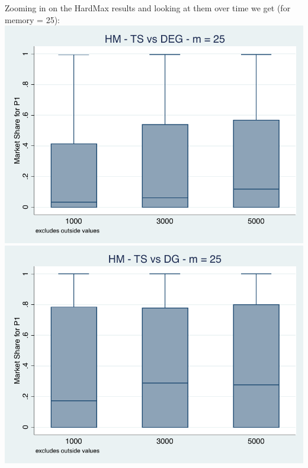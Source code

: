 \documentclass[11pt,letterpaper]{article}
\begin{document}
\pagebreak
Zooming in on the HardMax results and looking at them over time we get (for memory = 25): \\
\includegraphics[scale=0.9]{hm_ts_deg_25_timehorizon} \\ \includegraphics[scale=0.9]{hm_ts_dg_25_timehorizon}
\end{document}
